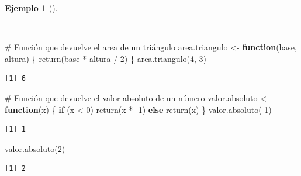 \documentclass[
  a4paper,
]{scrreport}
\newenvironment{Shaded}{\begin{snugshade}}{\end{snugshade}}
\newcommand{\CommentTok}[1]{\textcolor[rgb]{0.37,0.37,0.37}{#1}}
\newcommand{\ControlFlowTok}[1]{\textcolor[rgb]{0.00,0.23,0.31}{\textbf{#1}}}
\newcommand{\DecValTok}[1]{\textcolor[rgb]{0.68,0.00,0.00}{#1}}
\newcommand{\FunctionTok}[1]{\textcolor[rgb]{0.28,0.35,0.67}{#1}}
\newcommand{\NormalTok}[1]{\textcolor[rgb]{0.00,0.23,0.31}{#1}}
\newcommand{\OtherTok}[1]{\textcolor[rgb]{0.00,0.23,0.31}{#1}}
\newcommand{\SpecialCharTok}[1]{\textcolor[rgb]{0.37,0.37,0.37}{#1}}
\theoremstyle{definition}
\theoremstyle{definition}
\newtheorem{example}{Ejemplo}[chapter]
\theoremstyle{remark}
\begin{document}
\begin{example}[]\protect\hypertarget{exm-retorno-funciones}{}\label{exm-retorno-funciones}

~

\begin{Shaded}
\begin{Highlighting}[]
\CommentTok{\# Función que devuelve el area de un triángulo}
\NormalTok{area.triangulo }\OtherTok{\textless{}{-}} \ControlFlowTok{function}\NormalTok{(base, altura) \{}
  \FunctionTok{return}\NormalTok{(base }\SpecialCharTok{*}\NormalTok{ altura }\SpecialCharTok{/} \DecValTok{2}\NormalTok{)}
\NormalTok{\}}
\FunctionTok{area.triangulo}\NormalTok{(}\DecValTok{4}\NormalTok{, }\DecValTok{3}\NormalTok{)}
\end{Highlighting}
\end{Shaded}

\begin{verbatim}
[1] 6
\end{verbatim}

\begin{Shaded}
\begin{Highlighting}[]
\CommentTok{\# Función que devuelve el valor absoluto de un número}
\NormalTok{valor.absoluto }\OtherTok{\textless{}{-}} \ControlFlowTok{function}\NormalTok{(x) \{}
  \ControlFlowTok{if}\NormalTok{ (x }\SpecialCharTok{\textless{}} \DecValTok{0}\NormalTok{)}
    \FunctionTok{return}\NormalTok{(x }\SpecialCharTok{*} \SpecialCharTok{{-}}\DecValTok{1}\NormalTok{)}
  \ControlFlowTok{else}
    \FunctionTok{return}\NormalTok{(x)}
\NormalTok{\}}
\FunctionTok{valor.absoluto}\NormalTok{(}\SpecialCharTok{{-}}\DecValTok{1}\NormalTok{)}
\end{Highlighting}
\end{Shaded}

\begin{verbatim}
[1] 1
\end{verbatim}

\begin{Shaded}
\begin{Highlighting}[]
\FunctionTok{valor.absoluto}\NormalTok{(}\DecValTok{2}\NormalTok{)}
\end{Highlighting}
\end{Shaded}

\begin{verbatim}
[1] 2
\end{verbatim}

\end{example}
\end{document}

